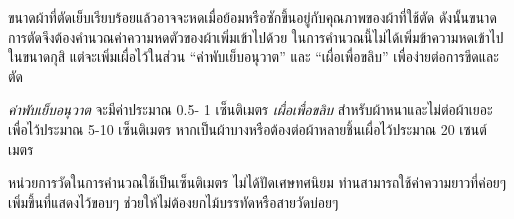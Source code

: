 ขนาดผ้าที่ตัดเย็บเรียบร้อยแล้วอาจจะหดเมื่อย้อมหรือซักขึ้นอยู่กับคุณภาพของผ้าที่ใช้ตัด
ดังนั้นขนาดการตัดจึงต้องคำนวณค่าความหดตัวของผ้าเพิ่มเข้าไปด้วย
ในการคำนวณนี้ไม่ได้เพิ่มข้าความหดเข้าไปในขนาดกุสิ แต่จะเพิ่มเผื่อไว้ในส่วน
``ค่าพับเย็บอนุวาต'' และ ``เผื่อเพื่อขลิบ'' เพื่อง่ายต่อการขีดและตัด

\emph{ค่าพับเย็บอนุวาต} จะมีค่าประมาณ 0.5- 1 เซ็นติเมตร \emph{เผื่อเพื่อขลิบ}
สำหรับผ้าหนาและไม่ต่อผ้าเยอะ เพื่อไว้ประมาณ 5-10 เซ็นติเมตร
หากเป็นผ้าบางหรือต้องต่อผ้าหลายชิ้นเผื่อไว้ประมาณ 20 เซนต์เมตร

หน่วยการวัดในการคำนวณใช้เป็นเซ็นติเมตร ไม่ได้ปัดเศษทศนิยม
ท่านสามารถใช้ค่าความยาวที่ค่อยๆ เพิ่มขึ้นที่แสดงไว้ขอบๆ
ช่วยให้ไม่ต้องยกไม้บรรทัดหรือสายวัดบ่อยๆ

